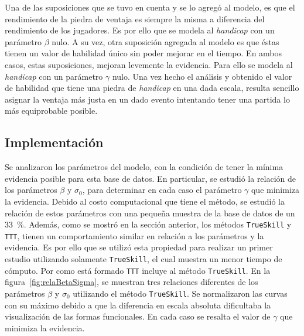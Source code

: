 \documentclass[11pt,twoside, spanish]{report} %
\begin{document}
Una de las suposiciones que se tuvo en cuenta y se lo agreg\'o al modelo, es que el rendimiento de la piedra de ventaja es siempre la misma a diferencia del rendimiento de los jugadores.
Es por ello que se modela al \textit{handicap} con un par\'ametro $\beta$ nulo.
A su vez, otra suposici\'on agregada al modelo es que \'estas tienen un valor de habilidad \'unico sin poder mejorar en el tiempo.
En ambos casos, estas suposiciones, mejoran levemente la evidencia.
Para ello se  modela al \textit{handicap} con un par\'ametro $\gamma$ nulo.
Una vez hecho el an\'alisis y obtenido el valor de habilidad que tiene una piedra de \textit{handicap} en una dada escala, resulta sencillo asignar la ventaja m\'as justa en un dado evento intentando tener una partida  lo m\'as equiprobable posible.








\subsection{Implementaci\'on}

Se analizaron los par\'ametros del modelo, con la condici\'on de tener la m\'inima evidencia posible para esta base de datos.
En particular, se estudi\'o la relaci\'on de los par\'ametros $\beta$ y $\sigma_0$, para determinar en cada caso el par\'ametro $\gamma$ que minimiza la evidencia.
Debido al costo computacional que tiene el m\'etodo, se estudi\'o la relaci\'on de estos par\'ametros con una peque\~na muestra de la base de datos de un \SI{33}{\percent}.
Adem\'as, como se mostr\'o en la secci\'on anterior, los m\'etodos \texttt{TrueSkill} y \texttt{TTT}, tienen un comportamiento similar en relaci\'on a los par\'ametros y la evidencia.
Es por ello que se utiliz\'o esta propiedad para realizar un primer estudio utilizando solamente \texttt{TrueSkill}, el cual muestra un menor tiempo de c\'omputo.
Por como est\'a formado \texttt{TTT} incluye al m\'etodo \texttt{TrueSkill}.
En la figura~\ref{fig:relaBetaSigma}, se muestran tres relaciones diferentes de los par\'ametros $\beta$ y $\sigma_0$ utilizando el m\'etodo \texttt{TrueSkill}.
Se normalizaron las curvas con su m\'aximo debido a que la diferencia en escala absoluta dificultaba la visualizaci\'on de las formas funcionales.
En cada caso se resalta el valor de $\gamma$ que minimiza la evidencia.
\end{document}

